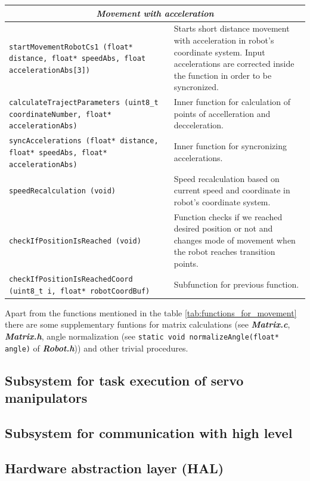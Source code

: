 \documentclass[a4paper,12pt]{article} %
\newcommand{\textitbf}[1]{\textbf{\textit{#1}}}
\newcommand{\inlinecode}[1]{\lstinline{#1}}
\begin{document}
\begin{longtable}[H]{|m{6 cm}|m{7 cm}|}
\multicolumn{2}{|c|}{\textitbf{Movement with acceleration}}\\
\hline
\inlinecode{startMovementRobotCs1 (float* distance, float* speedAbs, float accelerationAbs[3])} & Starts short distance movement with acceleration in robot's coordinate system. Input accelerations are corrected inside the function in order to be syncronized.\\
\hline
\inlinecode{calculateTrajectParameters (uint8_t coordinateNumber, float* accelerationAbs)} & Inner function for calculation of points of accelleration and decceleration.\\
\hline
\inlinecode{syncAccelerations (float* distance, float* speedAbs, float* accelerationAbs)} & Inner function for syncronizing accelerations.\\
\hline
\inlinecode{speedRecalculation (void)} & Speed recalculation based on current speed and coordinate in robot's coordinate system.\\
\hline
\inlinecode{checkIfPositionIsReached (void)} & Function checks if we reached desired position or not and changes mode of movement when the robot reaches transition points.\\
\hline
\inlinecode{checkIfPositionIsReachedCoord (uint8_t i, float* robotCoordBuf)} & Subfunction for previous function.\\
\hline
\end{longtable} 

Apart from the functions mentioned in the table \ref{tab:functions_for_movement} there are some supplementary funtions for matrix calculations (see \textitbf{Matrix.c}, \textitbf{Matrix.h}, angle normalization (see \inlinecode{static void normalizeAngle(float* angle)} of \textitbf{Robot.h})) and other trivial procedures.

\subsection{Subsystem for task execution of servo manipulators}

\subsection{Subsystem for communication with high level}

\subsection{Hardware abstraction layer (HAL)}


\end{document}
